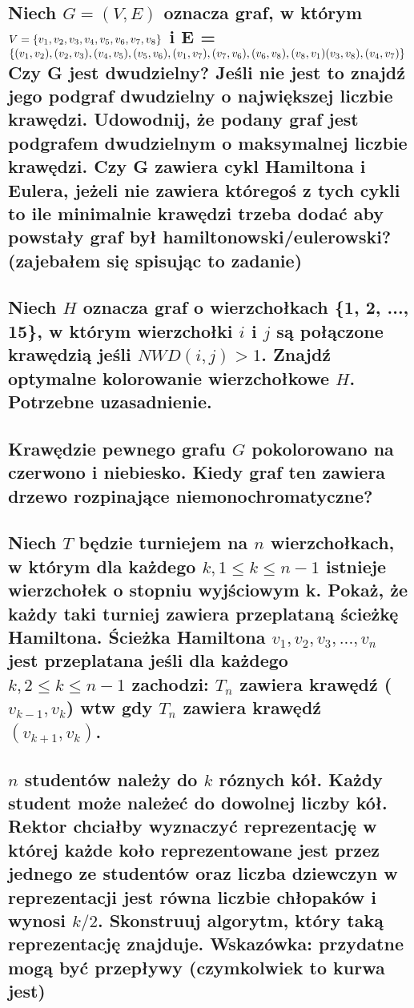 \documentclass[12pt]{article}
\begin{document}
\subsection{Niech $G = (V, E)$ oznacza graf, w którym $V = \{v_1, v_2, v_3, v_4, v_5,\\v_6, v_7, v_8\}$ i E = $\{(v_1, v_2), (v_2, v_3), (v_4, v_5), (v_5, v_6), (v_1, v_7),\\(v_7, v_6), (v_6, v_8), (v_8, v_1) (v_3, v_8), (v_4, v_7)\}$ Czy G jest dwudzielny? Jeśli nie jest to znajdź jego podgraf dwudzielny o największej liczbie krawędzi. Udowodnij, że podany graf jest podgrafem dwudzielnym o maksymalnej liczbie krawędzi. Czy G zawiera cykl Hamiltona i Eulera, jeżeli nie zawiera któregoś z tych cykli to ile minimalnie krawędzi trzeba dodać aby powstały graf był hamiltonowski/eulerowski? (zajebałem się spisując to zadanie)}

\subsection{Niech $H$ oznacza graf o wierzchołkach \{1, 2, ..., 15\}, w którym wierzchołki $i$ i $j$ są połączone krawędzią jeśli $NWD(i,j) > 1$. Znajdź optymalne kolorowanie wierzchołkowe $H$. Potrzebne uzasadnienie.}

\subsection{Krawędzie pewnego grafu $G$ pokolorowano na czerwono i niebiesko. Kiedy graf ten zawiera drzewo rozpinające niemonochromatyczne?}

\subsection{Niech $T$ będzie turniejem na $n$ wierzchołkach, w którym dla każdego $k, 1 \leq k \leq n - 1$ istnieje wierzchołek o stopniu wyjściowym k. Pokaż, że każdy taki turniej zawiera przeplataną ścieżkę Hamiltona. Ścieżka Hamiltona $v_1, v_2, v_3,...,v_n$ jest przeplatana jeśli dla każdego $k, 2 \leq k \leq n - 1$ zachodzi: $T_n$ zawiera krawędź ($v_{k-1}, v_k$) wtw gdy $T_n$ zawiera krawędź $(v_{k+1}, v_k)$.}

\newpage

\subsection{$n$ studentów należy do $k$ róznych kół. Każdy student może należeć do dowolnej liczby kół. Rektor chciałby wyznaczyć reprezentację w której każde koło reprezentowane jest przez jednego ze studentów oraz liczba dziewczyn w reprezentacji jest równa liczbie chłopaków i wynosi $k/2$. Skonstruuj algorytm, który taką reprezentację znajduje. Wskazówka: przydatne mogą być przepływy (czymkolwiek to kurwa jest)}
\end{document}
